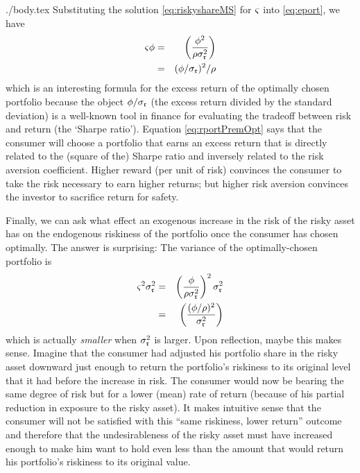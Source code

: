 \documentclass{bejournal}
\begin{document}
\begin{verbatimwrite}{./body.tex}
Substituting the solution \eqref{eq:riskyshareMS} for ${\varsigma}$ into \eqref{eq:eport}, we have
\begin{eqnarray}
  {\varsigma} \phi & = & \left(\frac{\phi^{2}}{\rho \sigma_{\mathfrak{r}}^{2}}\right)  \notag
\\ & = &  (\phi/\sigma_{\mathfrak{r}})^{2}/\rho \label{eq:rportPremOpt}
\end{eqnarray}
which is an interesting formula for the excess return of the optimally
chosen portfolio because the object $\phi/\sigma_{\mathfrak{r}}$ (the
excess return divided by the standard deviation) is a well-known tool
in finance for evaluating the tradeoff between risk and return (the
`Sharpe ratio').  Equation \eqref{eq:rportPremOpt} says that the consumer will
choose a portfolio that earns an excess return that is directly
related to the (square of the) Sharpe ratio and inversely related to the risk aversion
coefficient.  Higher reward (per unit of risk) convinces the consumer
to take the risk necessary to earn higher returns; but higher risk
aversion convinces the investor to sacrifice return for safety.

Finally, we can ask what effect an exogenous increase in the risk of the 
risky asset has on the endogenous riskiness of the portfolio once the consumer
has chosen optimally.  The answer is surprising: The variance of the optimally-chosen
portfolio is 
\begin{eqnarray}
{\varsigma}^{2} \sigma^{2}_{\mathfrak{r}} & = & \left(\frac{\phi}{\rho \sigma_{\mathfrak{r}}^{2}}\right)^{2} \sigma^{2}_{\mathfrak{r}}
\\ & = & \left(\frac{(\phi/\rho)^{2}}{\sigma_{\mathfrak{r}}^{2}}\right)
\end{eqnarray}
which is actually {\it smaller} when $\sigma^{2}_{\mathfrak{r}}$ is larger.
Upon reflection, maybe this makes sense.  Imagine that the consumer
had adjusted his portfolio share in the risky asset downward just
enough to return the portfolio's riskiness to its original level that
it had before the increase in risk.  The consumer would now be bearing
the same degree of risk but for a lower (mean) rate of return (because
of his partial reduction in exposure to the risky asset).  It makes
intuitive sense that the consumer will not be satisfied with this
``same riskiness, lower return'' outcome and therefore that the
undesirableness of the risky asset must have increased enough to make
him want to hold even less than the amount that would return his
portfolio's riskiness to its original value.



\end{verbatimwrite}
\end{document}
